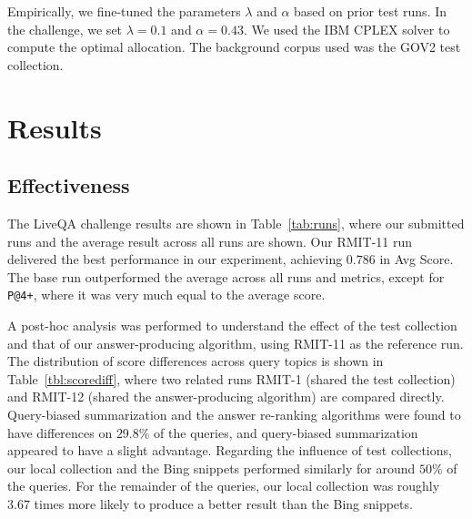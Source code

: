 \documentclass[a4paper,10pt,conference,compsocconf,final]{IEEEtran}
\newcommand{\shane}[1]{\textrm{\textcolor{orange}{Shane says: #1}}}
\newcommand{\ruey}[1]{\textrm{\textcolor{red}{Ruey says: #1}}}
\begin{document}
Empirically, we fine-tuned the parameters $\lambda$ and $\alpha$
based on prior test runs.
In the challenge, we set $\lambda = 0.1$ and $\alpha = 0.43$.
We used the IBM CPLEX solver to compute the optimal allocation.
The background corpus used was the GOV2 test collection.



\section{Results}

\subsection{Effectiveness}\label{sec:effectiveness}
The LiveQA challenge results are shown in Table~\ref{tab:runs}, where
our submitted runs and the average result across all runs are shown.
Our RMIT-11 run delivered the best performance in our experiment,
achieving $0.786$ {in} Avg Score.
The base run outperformed the average across all runs and metrics,
except for {\tt P@4+}, where it was very much equal to the average score.

A post-hoc analysis was performed to understand the effect of the test
collection and that of our answer-producing algorithm, using RMIT-11 as
the reference run.
The distribution of score differences across query topics is shown in
Table~\ref{tbl:scorediff}, where two related runs RMIT-1 (shared the
test collection) and RMIT-12 (shared the answer-producing algorithm)
are compared directly.
Query-biased summarization and the answer re-ranking algorithms were found
to have differences on $29.8\%$ of the queries, and query-biased
summarization appeared to have a slight advantage.
Regarding the influence of test collections, our local collection and 
the Bing snippets performed similarly for around $50\%$ of the
queries.
For the remainder of the queries, our local collection was roughly
$3.67$ times more likely to produce a better result than the Bing
snippets.


\end{document}
